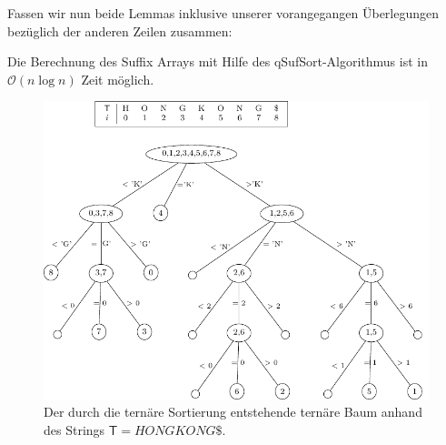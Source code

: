 Fassen wir nun beide Lemmas inklusive unserer vorangegangen Überlegungen bezüglich der anderen Zeilen zusammen: 
\begin{lemma}
Die Berechnung des Suffix Arrays mit Hilfe des qSufSort-Algorithmus ist in $\mathcal{O}(n\log n)$ Zeit möglich.
\end{lemma}
\begin{figure}[t]
\centering
\includegraphics[scale=0.9]{kapitel/saca_algorithmen/qsufsort/Bilder/TerTree.pdf}
\caption{Der durch die ternäre Sortierung entstehende ternäre Baum anhand des Strings $\mathsf{T}=HONGKONG\$$.}
\label{terTree}
\end{figure}